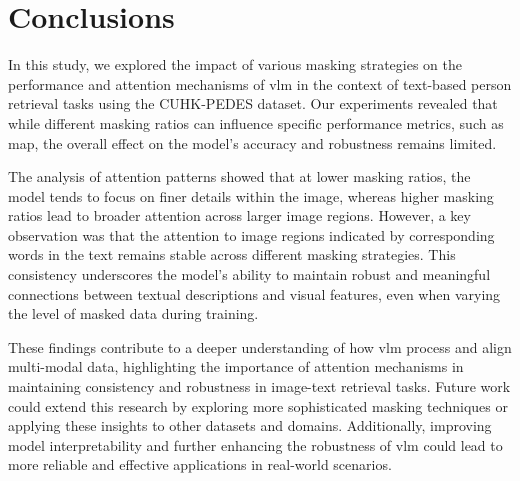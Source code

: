 \chapter{Conclusions}
In this study, we explored the impact of various masking strategies on the performance and attention mechanisms of \acrfull{vlm} in the context of text-based person retrieval tasks using the CUHK-PEDES dataset. Our experiments revealed that while different masking ratios can influence specific performance metrics, such as \acrfull{map}, the overall effect on the model's accuracy and robustness remains limited.

The analysis of attention patterns showed that at lower masking ratios, the model tends to focus on finer details within the image, whereas higher masking ratios lead to broader attention across larger image regions. However, a key observation was that the attention to image regions indicated by corresponding words in the text remains stable across different masking strategies. This consistency underscores the model's ability to maintain robust and meaningful connections between textual descriptions and visual features, even when varying the level of masked data during training.

These findings contribute to a deeper understanding of how \acrshort{vlm} process and align multi-modal data, highlighting the importance of attention mechanisms in maintaining consistency and robustness in image-text retrieval tasks. Future work could extend this research by exploring more sophisticated masking techniques or applying these insights to other datasets and domains. Additionally, improving model interpretability and further enhancing the robustness of \acrshort{vlm} could lead to more reliable and effective applications in real-world scenarios.

